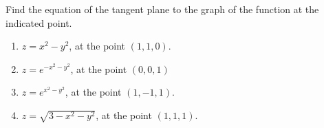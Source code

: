 
Find the equation of the tangent plane to the graph of the function at the indicated point.
\begin{enumerate}
\item $z= x^2- y^2$, at the point $(1, 1,0)$.
\item $z= e^{-x^2-y^2}$, at the point $(0,0,1)$
\item $z= e^{x^2-y^2}$, at the point $(1,-1,1)$.
\item $z=\sqrt{3-x^2-y^2} $, at the point $(1,1,1)$.
\end{enumerate}